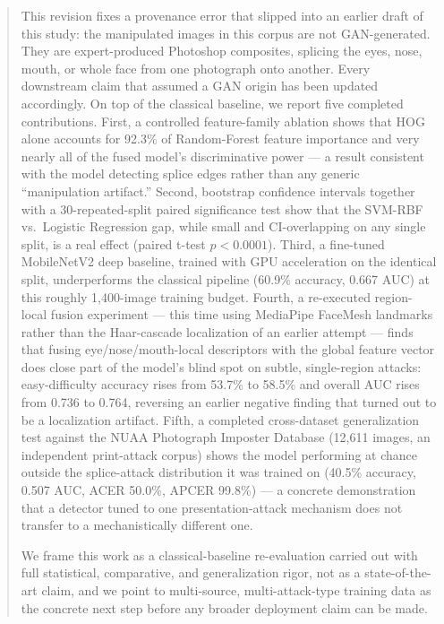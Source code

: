 \documentclass[11pt]{article}
\begin{document}
\begin{abstract}
This revision fixes a provenance error that slipped into an earlier draft of this study: the manipulated images in this corpus are not GAN-generated. They are expert-produced Photoshop composites, splicing the eyes, nose, mouth, or whole face from one photograph onto another. Every downstream claim that assumed a GAN origin has been updated accordingly. On top of the classical baseline, we report five completed contributions. First, a controlled feature-family ablation shows that HOG alone accounts for 92.3\% of Random-Forest feature importance and very nearly all of the fused model's discriminative power --- a result consistent with the model detecting splice edges rather than any generic ``manipulation artifact.'' Second, bootstrap confidence intervals together with a 30-repeated-split paired significance test show that the SVM-RBF vs.\ Logistic Regression gap, while small and CI-overlapping on any single split, is a real effect (paired t-test $p<0.0001$). Third, a fine-tuned MobileNetV2 deep baseline, trained with GPU acceleration on the identical split, underperforms the classical pipeline (60.9\% accuracy, 0.667 AUC) at this roughly 1,400-image training budget. Fourth, a re-executed region-local fusion experiment --- this time using MediaPipe FaceMesh landmarks rather than the Haar-cascade localization of an earlier attempt --- finds that fusing eye/nose/mouth-local descriptors with the global feature vector does close part of the model's blind spot on subtle, single-region attacks: easy-difficulty accuracy rises from 53.7\% to 58.5\% and overall AUC rises from 0.736 to 0.764, reversing an earlier negative finding that turned out to be a localization artifact. Fifth, a completed cross-dataset generalization test against the NUAA Photograph Imposter Database (12,611 images, an independent print-attack corpus) shows the model performing at chance outside the splice-attack distribution it was trained on (40.5\% accuracy, 0.507 AUC, ACER 50.0\%, APCER 99.8\%) --- a concrete demonstration that a detector tuned to one presentation-attack mechanism does not transfer to a mechanistically different one.

We frame this work as a classical-baseline re-evaluation carried out with full statistical, comparative, and generalization rigor, not as a state-of-the-art claim, and we point to multi-source, multi-attack-type training data as the concrete next step before any broader deployment claim can be made.
\end{abstract}

\tableofcontents
\newpage
\end{document}
